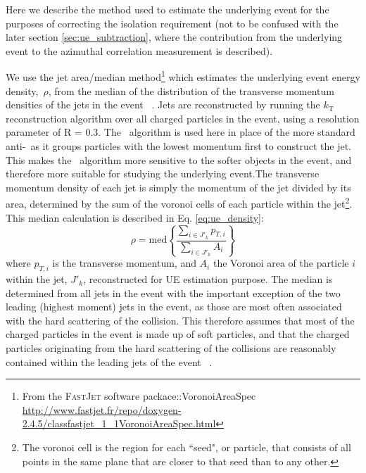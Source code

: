 Here we describe the method used to estimate the underlying event for the purposes of correcting the isolation requirement (not to be confused with the later section \ref{sec:ue_subtraction}, where the contribution from the underlying event to the azimuthal correlation measurement is described).

We use the jet area/median method\footnote{From the \textsc{FastJet} software packace::VoronoiAreaSpec \url{http://www.fastjet.fr/repo/doxygen-2.4.5/classfastjet_1_1VoronoiAreaSpec.html} } which estimates the underlying event energy density,~$\rho$, from the median of the distribution of the transverse momentum densities of the jets in the event ~\cite{Cacciari:2009dp}. Jets are reconstructed by running the $k_\mathrm{T}$ reconstruction algorithm over all charged particles in the event, using a resolution parameter of R = 0.3. The \kt~algorithm is used here in place of the more standard anti-\kt~as it groups particles with the lowest momentum first to construct the jet. This makes the \kt~algorithm more sensitive to the softer objects in the event, and therefore more suitable for studying the underlying event.The transverse momentum density of each jet is simply the momentum of the jet divided by its area, determined by the sum of the voronoi cells of each particle within the jet\footnote{The voronoi cell is the region for each ``seed", or particle, that  consists of all points in the same  plane that are closer to that seed than to any other.}. 
 This median calculation is described in Eq. \ref{eq:ue_density}:
\begin{equation}
\label{eq:ue_density}
  \rho = \mathrm{med} \left\{ \frac{\sum_{i\in J'_k}
    p_{T,i}}{\sum_{i\in J'_k} A_i} \right\}
\end{equation}
where $p_{T,i}$ is the transverse momentum, and $A_i$ the Voronoi area of the particle $i$ within the jet, $J'_k$, reconstructed for UE estimation purpose.  The median is determined from all jets in the event with the important exception of the two leading (highest moment) jets in the event, as those are most often associated with the hard scattering of the collision. This therefore assumes that most of the charged particles in the event is made up of soft particles, and that the charged particles originating from the hard scattering of the collisions are reasonably contained within the leading jets of the event ~\cite{Cacciari:2009dp}.\\

